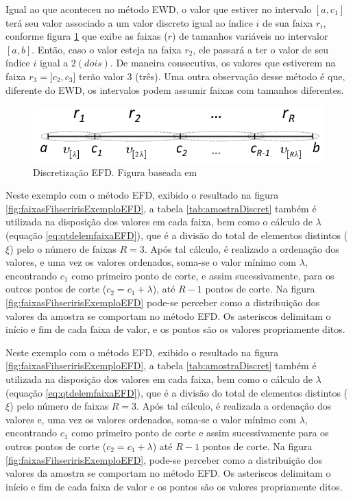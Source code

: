 Igual ao que aconteceu no método EWD, o valor que estiver no intervalo ${[a,c_1]}$ terá seu valor associado a um valor discreto igual ao índice ${i}$ de sua faixa ${r_i}$, conforme figura \ref{fig:faixasEFD} que exibe as  faixas (${r}$) de tamanhos variáveis no intervalor ${[a,b]}$. Então, caso o valor esteja na faixa ${r_2}$, ele passará a ter o valor de seu índice ${i}$ igual a ${2(dois)}$. De maneira consecutiva, os valores que estiverem na faixa ${r_3=]c_2,c_3]}$ terão valor 3 (três). Uma outra observação desse método é que, diferente do EWD, os intervalos podem assumir faixas com tamanhos diferentes.

\begin{figure}[h]
        \centering
        \includegraphics[scale=0.6]{figs/discretizacaoEFD.png}
        \caption[Discretização EFD]{Discretização EFD. Figura baseada em \cite{Lopes2016}} 
        \label{fig:faixasEFD}
\end{figure} 

Neste exemplo com o método EFD, exibido o resultado na figura \ref{fig:faixasFihseririsExemploEFD}, a tabela \ref{tab:amostraDiscret} também é utilizada na disposição dos valores em cada faixa, bem como o cálculo de ${\lambda}$ (equação \ref{eq:qtdelemfaixaEFD}), que é a divisão do total  de elementos distintos (${\xi}$) pelo o número de faixas ${R=3}$. Após tal cálculo, é realizado a ordenação dos valores, e uma  vez os valores ordenados, soma-se o valor mínimo com ${\lambda}$, encontrando ${c_1}$  como primeiro ponto de corte, e assim sucessivamente, para os outros pontos de corte (${c_2=c_1+\lambda}$), até ${R-1}$ pontos de corte. Na figura \ref{fig:faixasFihseririsExemploEFD} pode-se perceber como a distribuição  dos valores da amostra se comportam no método EFD. Os asteriscos delimitam o início e fim de cada faixa de valor, e os pontos são os valores propriamente ditos.

Neste exemplo com o método EFD, exibido o resultado na figura \ref{fig:faixasFihseririsExemploEFD}, a tabela \ref{tab:amostraDiscret} também é utilizada na disposição dos valores em cada faixa, bem como o cálculo de ${\lambda}$ (equação \ref{eq:qtdelemfaixaEFD}), que é a divisão do total de elementos distintos (${\xi}$) pelo  número de faixas ${R=3}$. Após tal cálculo, é realizada a ordenação dos valores e, uma vez os valores ordenados, soma-se o valor mínimo com ${\lambda}$, encontrando ${c_1}$ como primeiro ponto de corte e assim sucessivamente para os outros pontos de corte (${c_2=c_1+\lambda}$) até ${R-1}$ pontos de corte. Na figura \ref{fig:faixasFihseririsExemploEFD}, pode-se perceber como a distribuição dos valores da amostra se comportam no método EFD. Os asteriscos delimitam o início e fim de cada faixa de valor e os pontos são os valores propriamente ditos. 

